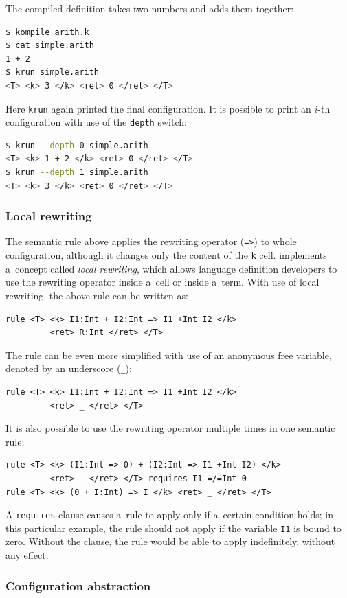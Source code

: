 \documentclass{fithesis3}
\newcommand{\krun}{\texttt{krun}\xspace}
\begin{document}
The compiled definition takes two numbers and adds them together:
\begin{lstlisting}[language=bash]
$ kompile arith.k
$ cat simple.arith
1 + 2
$ krun simple.arith
<T> <k> 3 </k> <ret> 0 </ret> </T>
\end{lstlisting}
Here \krun again printed the final configuration. It is possible to print an $i$-th configuration with use of the \texttt{depth} switch:
\begin{lstlisting}[language=bash]
$ krun --depth 0 simple.arith
<T> <k> 1 + 2 </k> <ret> 0 </ret> </T>
$ krun --depth 1 simple.arith
<T> <k> 3 </k> <ret> 0 </ret> </T>
\end{lstlisting}

\subsubsection{Local rewriting}
The semantic rule above applies the rewriting operator (\lstinline{=>}{}) to whole configuration, although it changes only the content of the \texttt{k} cell. \K implements a~concept called \textit{local rewriting}, which allows language definition developers to use the rewriting operator inside a~cell or inside a~term. With use of local rewriting, the above rule can be written as:
\begin{lstlisting}
rule <T> <k> I1:Int + I2:Int => I1 +Int I2 </k>
         <ret> R:Int </ret> </T>
\end{lstlisting}
The rule can be even more simplified with use of an anonymous free variable, denoted by an underscore (\lstinline{_}{}):
\begin{lstlisting}
rule <T> <k> I1:Int + I2:Int => I1 +Int I2 </k>
         <ret> _ </ret> </T>
\end{lstlisting}
It is also possible to use the rewriting operator multiple times in one semantic rule:
\begin{lstlisting}
rule <T> <k> (I1:Int => 0) + (I2:Int => I1 +Int I2) </k>
         <ret> _ </ret> </T> requires I1 =/=Int 0
rule <T> <k> (0 + I:Int) => I </k> <ret> _ </ret> </T>
\end{lstlisting}
A \texttt{requires} clause causes a~rule to apply only if a~certain condition holds; in this particular example, the rule should not apply if the variable \texttt{I1} is bound to zero. Without the clause, the rule would be able to apply indefinitely, without any effect.

 
\subsubsection{Configuration abstraction}
\end{document}
